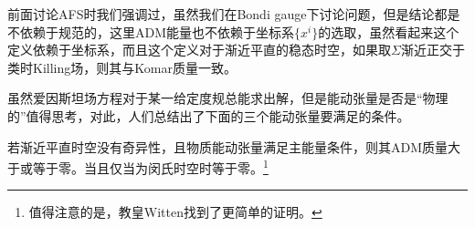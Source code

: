前面讨论AFS时我们强调过，虽然我们在Bondi gauge下讨论问题，但是结论都是不依赖于规范的，这里ADM能量也不依赖于坐标系$\{x^i\}$的选取，虽然看起来这个定义依赖于坐标系，而且这个定义对于渐近平直的稳态时空，如果取$\Sigma$渐近正交于类时Killing场，则其与Komar质量一致。

虽然爱因斯坦场方程对于某一给定度规总能求出解，但是能动张量是否是“物理的”值得思考，对此，人们总结出了下面的三个能动张量要满足的条件。
\begin{definition}[弱能量条件]
	
\end{definition}

\begin{definition}[强能量条件]
	
\end{definition}
\begin{definition}[主能量条件]
	
\end{definition}
\begin{theorem}
	若渐近平直时空没有奇异性，且物质能动张量满足主能量条件，则其ADM质量大于或等于零。当且仅当为闵氏时空时等于零。\footnote{值得注意的是，教皇Witten找到了更简单的证明\cite{Witten:1981mf,Parker:1981uy}。}
\end{theorem}

